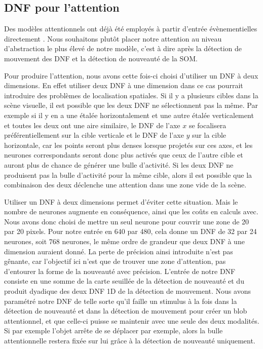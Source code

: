 	\subsection{DNF pour l'attention}

	Des modèles attentionnels ont déjà été employés à partir d'entrée évènementielles directement \cite{evanusa2019event}. Nous souhaitons plutôt placer notre attention au niveau d'abstraction le plus élevé de notre modèle, c'est à dire après la détection de mouvement des DNF et la détection de nouveauté de la SOM.

	Pour produire l'attention, nous avons cette fois-ci choisi d'utiliser un DNF à deux dimensions. En effet utiliser deux DNF à une dimension dans ce cas pourrait introduire des problèmes de localisation spatiales. Si il y a plusieurs cibles dans la scène visuelle, il est possible que les deux DNF ne sélectionnent pas la même. Par exemple si il y en a une étalée horizontalement et une autre étalée verticalement et toutes les deux ont une aire similaire, le DNF de l'axe $x$ se focalisera préférentiellement sur la cible verticale et le DNF de l'axe $y$ sur la cible horizontale, car les points seront plus denses lorsque projetés sur ces axes, et les neurones correspondants seront donc plus activés que ceux de l'autre cible et auront plus de chance de générer une bulle d'activité. Si les deux DNF ne produisent pas la bulle d'activité pour la même cible, alors il est possible que la combinaison des deux déclenche une attention dans une zone vide de la scène.

	Utiliser un DNF à deux dimensions permet d'éviter cette situation. Mais le nombre de neurones augmente en conséquence, ainsi que les coûts en calculs avec. Nous avons donc choisi de mettre un seul neurone pour couvrir une zone de 20 par 20 pixels. Pour notre entrée en 640 par 480, cela donne un DNF de 32 par 24 neurones, soit 768 neurones, le même ordre de grandeur que deux DNF à une dimension auraient donné. La perte de précision ainsi introduite n'est pas gênante, car l'objectif ici n'est que de trouver une zone d'attention, pas d'entourer la forme de la nouveauté avec précision. L'entrée de notre DNF consiste en une somme de la carte seuillée de la détection de nouveauté et du produit dyadique des deux DNF 1D de la détection de mouvement. Nous avons paramétré notre DNF de telle sorte qu'il faille un stimulus à la fois dans la détection de nouveauté et dans la détection de mouvement pour créer un blob attentionnel, et que celle-ci puisse se maintenir avec une seule des deux modalités. Si par exemple l'objet arrête de se déplacer par exemple, alors la bulle attentionnelle restera fixée sur lui grâce à la détection de nouveauté uniquement.

